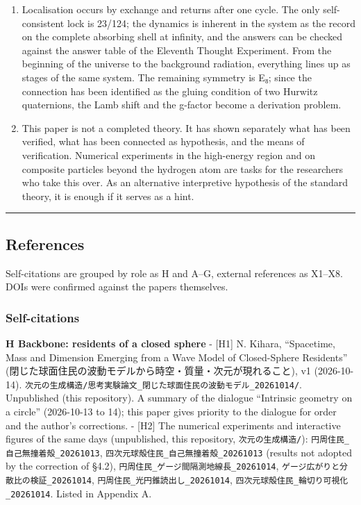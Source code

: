 \documentclass[
  a4paper,
]{article}
\begin{document}
\begin{enumerate}
  development of this paper, not its subject.
\item
  Localisation occurs by exchange and returns after one cycle. The only
  self-consistent lock is 23/124; the dynamics is inherent in the system
  as the record on the complete absorbing shell at infinity, and the
  answers can be checked against the answer table of the Eleventh
  Thought Experiment. From the beginning of the universe to the
  background radiation, everything lines up as stages of the same
  system. The remaining symmetry is E₈; since the connection has been
  identified as the gluing condition of two Hurwitz quaternions, the
  Lamb shift and the g-factor become a derivation problem.
\item
  This paper is not a completed theory. It has shown separately what has
  been verified, what has been connected as hypothesis, and the means of
  verification. Numerical experiments in the high-energy region and on
  composite particles beyond the hydrogen atom are tasks for the
  researchers who take this over. As an alternative interpretive
  hypothesis of the standard theory, it is enough if it serves as a
  hint.
\end{enumerate}

\begin{center}\rule{0.5\linewidth}{0.5pt}\end{center}

\subsection{References}\label{references}

Self-citations are grouped by role as H and A--G, external references as
X1--X8. DOIs were confirmed against the papers themselves.

\subsubsection{Self-citations}\label{self-citations}

\textbf{H Backbone: residents of a closed sphere} - {[}H1{]} N. Kihara,
``Spacetime, Mass and Dimension Emerging from a Wave Model of
Closed-Sphere Residents''
(閉じた球面住民の波動モデルから時空・質量・次元が現れること), v1
(2026-10-14).
\texttt{次元の生成構造/\allowbreak{}思考実験論文\_\allowbreak{}閉じた球面住民の波動モデル\_\allowbreak{}20261014/\allowbreak{}}.
Unpublished (this repository). A summary of the dialogue ``Intrinsic
geometry on a circle'' (2026-10-13 to 14); this paper gives priority to
the dialogue for order and the author's corrections. - {[}H2{]} The
numerical experiments and interactive figures of the same days
(unpublished, this repository, \texttt{次元の生成構造/\allowbreak{}}):
\texttt{円周住民\_\allowbreak{}自己無撞着殻\_\allowbreak{}20261013},
\texttt{四次元球殻住民\_\allowbreak{}自己無撞着殻\_\allowbreak{}20261013} (results not adopted by
the correction of §4.2),
\texttt{円周住民\_\allowbreak{}ゲージ間隔測地線長\_\allowbreak{}20261014},
\texttt{ゲージ広がりと分散比の検証\_\allowbreak{}20261014},
\texttt{円周住民\_\allowbreak{}光円錐読出し\_\allowbreak{}20261014},
\texttt{四次元球殻住民\_\allowbreak{}輪切り可視化\_\allowbreak{}20261014}. Listed in Appendix A.
\end{document}
